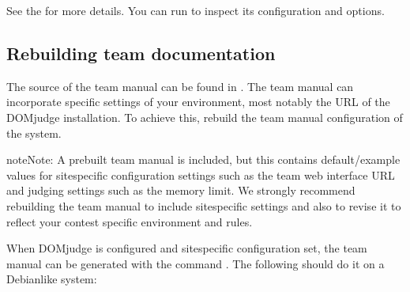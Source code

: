 \documentclass[a4paper,10pt,english,openany]{sphinxmanual}
\begin{document}
\begin{sphinxVerbatim}[commandchars=\\\{\}]
     
\end{sphinxVerbatim}

\sphinxAtStartPar
See the  for more details. You can run 
to inspect its configuration and options.


\subsection{Rebuilding team documentation}
\label{\detokenize{install-workstation:rebuilding-team-documentation}}
\sphinxAtStartPar
The source of the team manual can be found in .
The team manual can incorporate specific settings of your environment,
most notably the URL of the DOMjudge installation. To achieve this,
rebuild the team manual  configuration of the system.

\begin{sphinxadmonition}{note}{Note:}
\sphinxAtStartPar
A prebuilt team manual is included, but this contains
default/example values for site\sphinxhyphen{}specific configuration settings such
as the team web interface URL and judging settings such as the memory
limit. We strongly recommend rebuilding the team manual to include
site\sphinxhyphen{}specific settings and also to revise it to reflect your contest
specific environment and rules.
\end{sphinxadmonition}

\sphinxAtStartPar
When DOMjudge is configured and site\sphinxhyphen{}specific configuration set,
the team manual can be generated with the command .
The following should do it on a Debian\sphinxhyphen{}like system:

\begin{sphinxVerbatim}[commandchars=\\\{\}]
      
 
 
\end{sphinxVerbatim}
\end{document}
